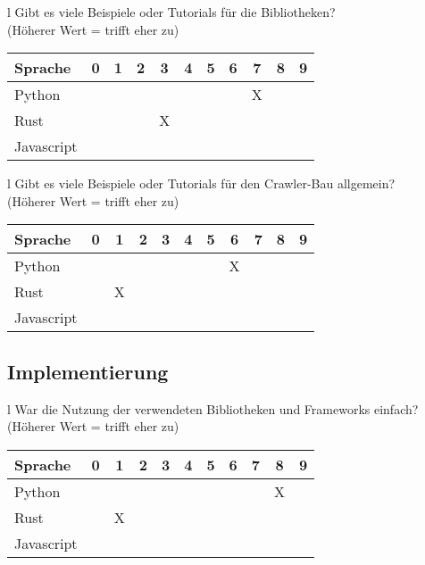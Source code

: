 \begin{tabular}{l}
	Gibt es viele Beispiele oder Tutorials für die Bibliotheken? \\
	(Höherer Wert = trifft eher zu)                              \\
	\begin{tabular}{| l | c | c | c | c | c | c | c | c | c | c |}
		\hline
		Sprache    & 0 & 1 & 2 & 3 & 4 & 5 & 6 & 7 & 8 & 9 \\
		\hline
		Python     &   &   &   &   &   &   &   & X &   &   \\
		\hline
		Rust       &   &   &   & X &   &   &   &   &   &   \\
		\hline
		Javascript &   &   &   &   &   &   &   &   &   &   \\
		\hline
	\end{tabular}
\end{tabular}

\begin{tabular}{l}
	Gibt es viele Beispiele oder Tutorials für den Crawler-Bau allgemein? \\
	(Höherer Wert = trifft eher zu)                                       \\
	\begin{tabular}{| l | c | c | c | c | c | c | c | c | c | c |}
		\hline
		Sprache    & 0 & 1 & 2 & 3 & 4 & 5 & 6 & 7 & 8 & 9 \\
		\hline
		Python     &   &   &   &   &   &   & X &   &   &   \\
		\hline
		Rust       &   & X &   &   &   &   &   &   &   &   \\
		\hline
		Javascript &   &   &   &   &   &   &   &   &   &   \\
		\hline
	\end{tabular}
\end{tabular}

\subsection{Implementierung}

\begin{tabular}{l}
	War die Nutzung der verwendeten Bibliotheken und Frameworks einfach? \\
	(Höherer Wert = trifft eher zu)                                      \\
	\begin{tabular}{| l | c | c | c | c | c | c | c | c | c | c |}
		\hline
		Sprache    & 0 & 1 & 2 & 3 & 4 & 5 & 6 & 7 & 8 & 9 \\
		\hline
		Python     &   &   &   &   &   &   &   &   & X &   \\
		\hline
		Rust       &   & X &   &   &   &   &   &   &   &   \\
		\hline
		Javascript &   &   &   &   &   &   &   &   &   &   \\
		\hline
	\end{tabular}
\end{tabular}

